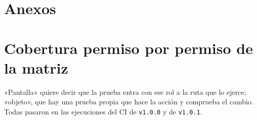 \documentclass[11pt,letterpaper]{article}
\newcommand{\cod}[1]{\texttt{\small #1}}
\begin{document}

\newpage
\section{Anexos}\label{sec:anexos}
\appendix

\section{Cobertura permiso por permiso de la matriz}

«Pantalla» quiere decir que la prueba entra con ese rol a la ruta que lo ejerce; «objeto», que hay una prueba propia que hace la acción y comprueba el cambio. Todas pasaron en las ejecuciones del CI de \cod{v1.0.0} y de \cod{v1.0.1}.

\end{document}
